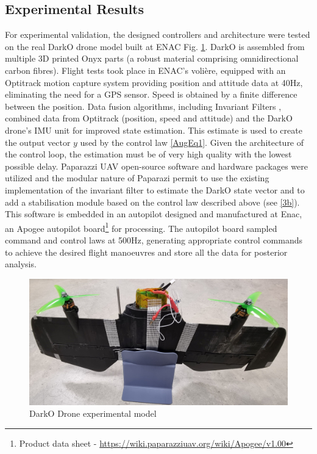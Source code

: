 \subsection{Experimental Results}
For experimental validation, the designed controllers and architecture were tested on the real DarkO drone model built at ENAC Fig. \ref{DarkO1}. DarkO is assembled from multiple 3D printed Onyx parts (a robust material comprising omnidirectional carbon fibres). Flight tests took place in ENAC's volière, equipped with an Optitrack motion capture system providing position and attitude data at 40Hz, eliminating the need for a GPS sensor. Speed is obtained by a finite difference between the position. Data fusion algorithms, including Invariant Filters \cite{condomines2013,Condomines2014}, combined data from Optitrack (position, speed and attitude) and the DarkO drone's IMU unit for improved state estimation. This estimate is used to create the output vector $y$ used by the control law \eqref{AugEq1}. Given the architecture of the control loop, the estimation must be of very high quality with the lowest possible delay.
Paparazzi UAV open-source software and hardware packages were utilized \cite{hattenberger2014} and the modular nature of Paparazi permit to use the existing implementation of the invariant filter to estimate the DarkO state vector and to add a stabilisation module based on the control law described above (see \ref{3b}). This software is embedded in an autopilot designed and manufactured at Enac, an Apogee autopilot board\footnote{Product data sheet - \url{https://wiki.paparazziuav.org/wiki/Apogee/v1.00}} for processing. The autopilot board sampled command and control laws at 500Hz, generating appropriate control commands to achieve the desired flight manoeuvres and store all the data for posterior analysis.
\begin{figure}[ht]
    \centering
    \includegraphics[width=0.8\columnwidth]{figures/DarkOModelfinal.jpg}
   \vspace{-0.2cm}\caption{DarkO Drone experimental model}
    \label{DarkO1}
\end{figure}
